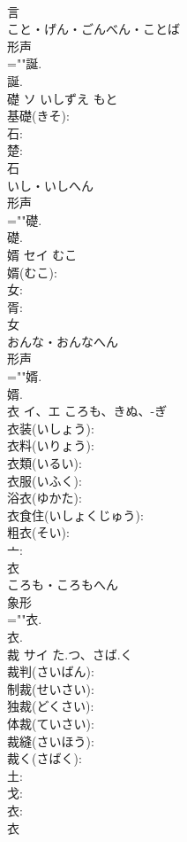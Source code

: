 \documentclass[8pt]{extreport}
\begin{document}
\begin{CJK}{UTF8}{min}
\\	言	
\\	こと・げん・ごんべん・ことば	
\\	形声 
\\	=""誕.
\\	誕.
\\	礎	ソ	いしずえ	もと	
\\	基礎(きそ): 
\\	石: 
\\	楚: 
\\	石	
\\	いし・いしへん	
\\	形声 
\\	=""礎.
\\	礎.
\\	婿	セイ	むこ		
\\	婿(むこ): 
\\	女: 
\\	胥: 
\\	女	
\\	おんな・おんなへん	
\\	形声 
\\	=""婿.
\\	婿.
\\	衣	イ、エ	ころも、きぬ、-ぎ		
\\	衣装(いしょう): 
\\	衣料(いりょう): 
\\	衣類(いるい): 
\\	衣服(いふく): 
\\	浴衣(ゆかた): 
\\	衣食住(いしょくじゅう): 
\\	粗衣(そい): 
\\	亠: 
\\	衣	
\\	ころも・ころもへん	
\\	象形 
\\	=""衣.
\\	衣.
\\	裁	サイ	た.つ、さば.く		
\\	裁判(さいばん): 
\\	制裁(せいさい): 
\\	独裁(どくさい): 
\\	体裁(ていさい): 
\\	裁縫(さいほう): 
\\	裁く(さばく): 
\\	土: 
\\	戈: 
\\	衣: 
\\	衣	

\end{CJK}
\end{document}
